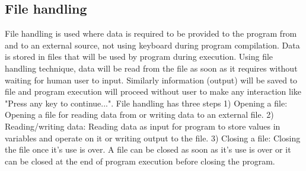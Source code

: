 \documentclass{sig-alternate}
\begin{document}
	\subsection{File handling}
	File handling is used where data is required to be provided to the program from and to an external source, not using keyboard during program compilation. Data is stored in files that will be used by program during execution. Using file handling technique, data will be read from the file as soon as it requires without waiting for human user to input. Similarly information (output) will be saved to file and program execution will proceed without user to make any interaction like "Press any key to continue...". File handling has three steps 1) Opening a file: Opening a file for reading data from or writing data to an external file. 2) Reading/writing data: Reading data as input for program to store values in variables and operate on it or writing output to the file. 3) Closing a file: Closing the file once it's use is over. A file can be closed as soon as it's use is over or it can be closed at the end of program execution before closing the program.
\end{document}

